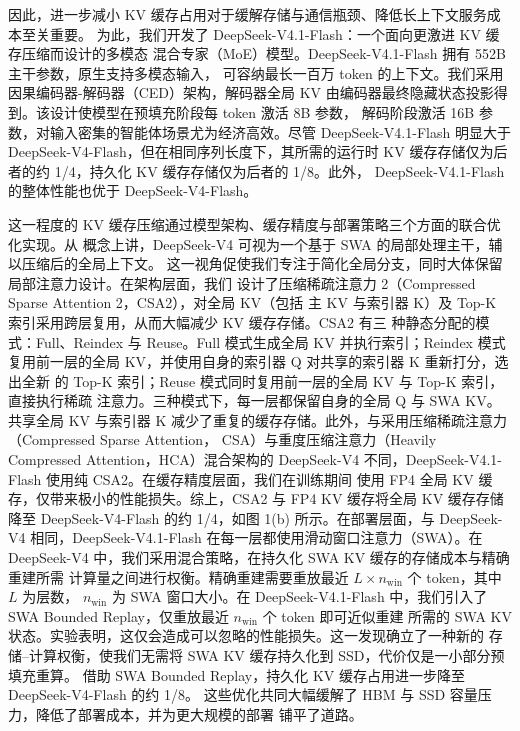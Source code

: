 因此，进一步减小 KV 缓存占用对于缓解存储与通信瓶颈、降低长上下文服务成本至关重要。
为此，我们开发了 DeepSeek-V4.1-Flash：一个面向更激进 KV 缓存压缩而设计的多模态
混合专家（MoE）模型。DeepSeek-V4.1-Flash 拥有 552B 主干参数，原生支持多模态输入，
可容纳最长一百万 token 的上下文。我们采用因果编码器-解码器（CED）架构，解码器全局
KV 由编码器最终隐藏状态投影得到。该设计使模型在预填充阶段每 token 激活 8B 参数，
解码阶段激活 16B 参数，对输入密集的智能体场景尤为经济高效。尽管
DeepSeek-V4.1-Flash 明显大于 DeepSeek-V4-Flash，但在相同序列长度下，其所需的运行时
KV 缓存存储仅为后者的约 1/4，持久化 KV 缓存存储仅为后者的 1/8。此外，
DeepSeek-V4.1-Flash 的整体性能也优于 DeepSeek-V4-Flash。

这一程度的 KV 缓存压缩通过模型架构、缓存精度与部署策略三个方面的联合优化实现。从
概念上讲，DeepSeek-V4 可视为一个基于 SWA 的局部处理主干，辅以压缩后的全局上下文。
这一视角促使我们专注于简化全局分支，同时大体保留局部注意力设计。在架构层面，我们
设计了压缩稀疏注意力 2（Compressed Sparse Attention 2，CSA2），对全局 KV（包括
主 KV 与索引器 K）及 Top-K 索引采用跨层复用，从而大幅减少 KV 缓存存储。CSA2 有三
种静态分配的模式：Full、Reindex 与 Reuse。Full 模式生成全局 KV 并执行索引；Reindex
模式复用前一层的全局 KV，并使用自身的索引器 Q 对共享的索引器 K 重新打分，选出全新
的 Top-K 索引；Reuse 模式同时复用前一层的全局 KV 与 Top-K 索引，直接执行稀疏
注意力。三种模式下，每一层都保留自身的全局 Q 与 SWA KV。共享全局 KV 与索引器 K
减少了重复的缓存存储。此外，与采用压缩稀疏注意力（Compressed Sparse Attention，
CSA）与重度压缩注意力（Heavily Compressed Attention，HCA）混合架构的
DeepSeek-V4 不同，DeepSeek-V4.1-Flash 使用纯 CSA2。在缓存精度层面，我们在训练期间
使用 FP4 全局 KV 缓存，仅带来极小的性能损失。综上，CSA2 与 FP4 KV 缓存将全局 KV
缓存存储降至 DeepSeek-V4-Flash 的约 1/4，如图 1(b) 所示。在部署层面，与
DeepSeek-V4 相同，DeepSeek-V4.1-Flash 在每一层都使用滑动窗口注意力（SWA）。在
DeepSeek-V4 中，我们采用混合策略，在持久化 SWA KV 缓存的存储成本与精确重建所需
计算量之间进行权衡。精确重建需要重放最近
\(L \times n _ { \mathrm { w i n } }\) 个 token，其中 $L$ 为层数，
\(n _ { \mathrm { w i n } }\) 为 SWA 窗口大小。在 DeepSeek-V4.1-Flash 中，我们引入了
SWA Bounded Replay，仅重放最近 \(n _ { \mathrm { w i n } }\) 个 token 即可近似重建
所需的 SWA KV 状态。实验表明，这仅会造成可以忽略的性能损失。这一发现确立了一种新的
存储--计算权衡，使我们无需将 SWA KV 缓存持久化到 SSD，代价仅是一小部分预填充重算。
借助 SWA Bounded Replay，持久化 KV 缓存占用进一步降至 DeepSeek-V4-Flash 的约 1/8。
这些优化共同大幅缓解了 HBM 与 SSD 容量压力，降低了部署成本，并为更大规模的部署
铺平了道路。




